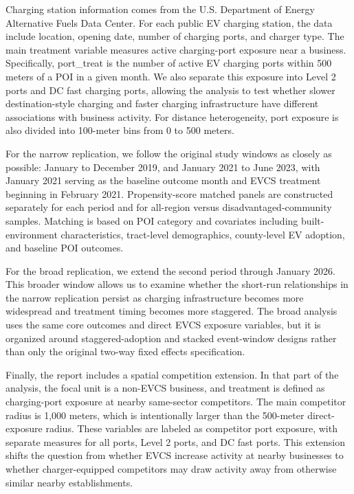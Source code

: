 \documentclass[12pt]{article}
\begin{document}
Charging station information comes from the U.S. Department of Energy Alternative Fuels Data Center. For each public EV charging station, the data include location, opening date, number of charging ports, and charger type. The main treatment variable measures active charging-port exposure near a business. Specifically, port\_treat is the number of active EV charging ports within 500 meters of a POI in a given month. We also separate this exposure into Level 2 ports and DC fast charging ports, allowing the analysis to test whether slower destination-style charging and faster charging infrastructure have different associations with business activity. For distance heterogeneity, port exposure is also divided into 100-meter bins from 0 to 500 meters.

For the narrow replication, we follow the original study windows as closely as possible: January to December 2019, and January 2021 to June 2023, with January 2021 serving as the baseline outcome month and EVCS treatment beginning in February 2021. Propensity-score matched panels are constructed separately for each period and for all-region versus disadvantaged-community samples. Matching is based on POI category and covariates including built-environment characteristics, tract-level demographics, county-level EV adoption, and baseline POI outcomes.

For the broad replication, we extend the second period through January 2026. This broader window allows us to examine whether the short-run relationships in the narrow replication persist as charging infrastructure becomes more widespread and treatment timing becomes more staggered. The broad analysis uses the same core outcomes and direct EVCS exposure variables, but it is organized around staggered-adoption and stacked event-window designs rather than only the original two-way fixed effects specification.

Finally, the report includes a spatial competition extension. In that part of the analysis, the focal unit is a non-EVCS business, and treatment is defined as charging-port exposure at nearby same-sector competitors. The main competitor radius is 1,000 meters, which is intentionally larger than the 500-meter direct-exposure radius. These variables are labeled as competitor port exposure, with separate measures for all ports, Level 2 ports, and DC fast ports. This extension shifts the question from whether EVCS increase activity at nearby businesses to whether charger-equipped competitors may draw activity away from otherwise similar nearby establishments.
\end{document}
